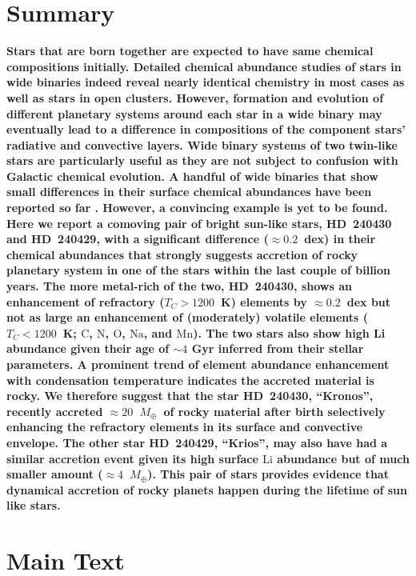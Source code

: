 \documentclass[12pt,letterpaper,margin=1in]{article}
\newcommand*\elem[1]{\ensuremath{\mathrm{#1}}}
\newcommand{\Tcondens}{\ensuremath{T_C}}
\newcommand{\mearth}{\ensuremath{M_\oplus}}
\begin{document}
\section{Summary}
{\bf \noindent
  Stars that are born together are expected to have same chemical compositions
  initially.
  Detailed chemical abundance studies of stars in wide binaries indeed reveal
  nearly identical chemistry in most
  cases\citep{Gratton:2001aa,Desidera:2004aa} as well as stars in open
  clusters\cite{Bovy:2016aa}.
  However, formation and evolution of different planetary systems around each
  star in a wide binary may eventually lead to a difference in compositions of
  the component stars' radiative and convective
  layers\cite{Pinsonneault:2001aa,Chambers:2010aa}.
  Wide binary systems of two twin-like stars are particularly useful
  as they are not subject to confusion with Galactic chemical evolution.
  A handful of wide binaries that show small differences in their surface
  chemical abundances have been reported so far
  \cite{Mack:2014aa,Mack:2016aa,Saffe:2015aa,Teske:2013aa,
    Teske:2015aa,Teske:2016aa,Teske:2016ab,Biazzo:2015aa,Ramirez:2015aa}.
  However, a convincing example is yet to be found.
  Here we report a comoving pair of bright sun-like stars, HD~240430 and HD~240429,
  with a significant difference ($\approx 0.2$~dex) in their chemical
  abundances that strongly suggests accretion of rocky planetary system in one
  of the stars within the last couple of billion years.
  The more metal-rich of the two, HD~240430, shows an enhancement of refractory
  ($\Tcondens>1200$~K) elements by $\approx 0.2$~dex but not as large
  an enhancement of (moderately) volatile elements ($\Tcondens<1200$~K; \elem{C},
  \elem{N}, \elem{O}, \elem{Na}, and \elem{Mn}).
  The two stars also show high Li abundance given their age of $\sim 4$ Gyr
  inferred from their stellar parameters.
  A prominent trend of element abundance enhancement with condensation temperature
  indicates the accreted material is rocky.
  We therefore suggest that the star HD~240430, ``Kronos'', recently accreted
  $\approx 20$~\mearth\ of rocky material after birth selectively enhancing the
  refractory elements in its surface and convective envelope.
  The other star HD~240429, ``Krios'', may also have had a similar accretion
  event given its high surface \elem{Li} abundance but of much smaller amount
  ($\approx 4$~\mearth).
  This pair of stars provides evidence that dynamical accretion of rocky planets
  happen during the lifetime of sun like stars.
}

\section{Main Text}
\end{document}
